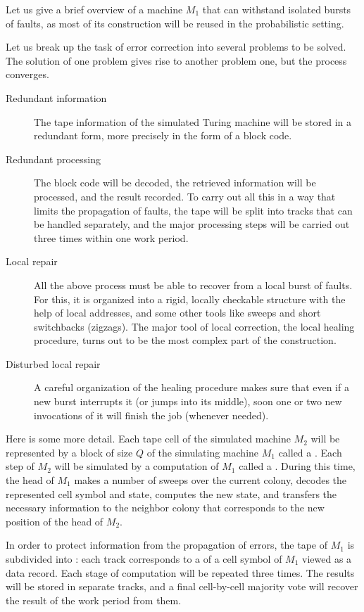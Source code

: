 \documentclass[12pt]{memoir}
\newcommand{\Q}{Q}
\begin{document}
Let us give a brief overview of a machine \( M_{1} \) that
can withstand isolated bursts of faults, as most of its construction will be reused
in the probabilistic setting.

Let us break up the task of error correction into several 
problems to be solved.
The solution of one problem gives rise to another problem one, 
but the process converges.
\begin{description}
\item[Redundant information] The tape information of the simulated Turing machine
will be stored in a redundant form, more precisely in the form of a block code.
\item[Redundant processing] The block code will be decoded, the retrieved information 
will be processed, and the result recorded.
To carry out all this in a way that limits the propagation of faults, the tape will be split
into tracks that can be handled separately, and the major processing steps will be 
carried out three times within one work period.
\item[Local repair] All the above process must be able to recover from a local burst of faults.
For this, it is organized into a rigid, locally checkable structure
with the help of local addresses, and some other tools like sweeps and 
short switchbacks (zigzags).
The major tool of local correction, the local healing procedure, turns out to be the most
complex part of the construction.
\item[Disturbed local repair] A careful organization of the healing procedure
makes sure that even if a new burst interrupts it (or jumps into its middle),
soon one or two new invocations of it will finish the job (whenever needed).
\end{description}

Here is some more detail.
Each tape cell of the simulated machine \( M_{2} \) will be represented by a block of
size \( \Q \) of the simulating machine \( M_{1} \) called a .
Each step of \( M_{2} \) will be simulated by a computation of \( M_{1} \) called
a .
During this time, the head of \( M_{1} \) makes a number of sweeps over the
current colony, decodes the represented cell symbol and state,
computes the new state, and transfers the necessary information to the 
neighbor colony that corresponds to the new position of the head of \( M_{2} \).

In order to protect information from the propagation of errors,
the tape of \( M_{1} \) is subdivided into : each track corresponds to a 
 of a cell symbol of \( M_{1} \) viewed as a data record.
Each stage of computation will be repeated three times.
The results will be stored in separate tracks, and a final cell-by-cell majority vote
will recover the result of the work period from them.
\end{document}
